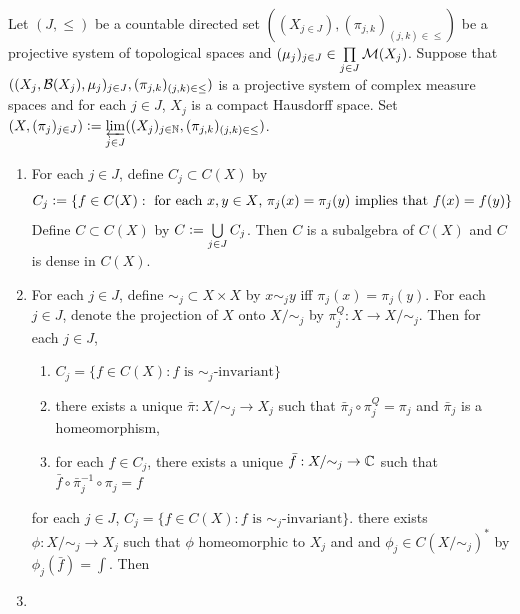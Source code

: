 \documentclass{book}
\begin{document}
	
	\begin{ex} 
		Let $(J, {\leq})$ be a countable directed set $((X_{j \in J}), (\pi_{j,k})_{(j,k) \in \leq})$ be a projective system of topological spaces and $(\mu_j)_{j \in J} \in \prod\limits_{j \in J} \mathcal{M}(X_j)$. Suppose that $((X_j, \mathcal{B}(X_j), \mu_j)_{j \in J}, (\pi_{j,k})_{(j,k) \in {\leq}})$ is a projective system of complex measure spaces and for each $j \in J$, $X_j$ is a compact Hausdorff space. Set $(X, (\pi_j)_{j \in J}) \vcentcolon= \varprojlim\limits_{j \in J} ((X_j)_{j \in \mathbb{N}}, (\pi_{j,k})_{(j,k) \in {\leq}})$. 
		\begin{enumerate}
			\item For each $j \in J$, define $C_j \subset C(X)$ by 
			$$C_j \vcentcolon= \{f \in C(X): \text{ for each $x,y \in X$, $\pi_j(x) = \pi_j(y)$ implies that $f(x) = f(y)$}\}$$
			Define $C \subset C(X)$ by $C \vcentcolon= \bigcup\limits_{j \in J} C_j$. Then $C$ is a subalgebra of $C(X)$ and $C$ is dense in $C(X)$. 
			\item For each $j \in J$, define ${\sim_j}  \subset X \times X$ by $x \sim_j y$ iff $\pi_j(x) = \pi_j(y)$. For each $j \in J$, denote the projection of $X$ onto $X/{\sim_j}$ by $\pi^Q_j: X \rightarrow X/{\sim_j}$. Then for each $j \in J$,
			\begin{enumerate}
				\item $C_j = \{f \in C(X): \text{$f$ is $\sim_j$-invariant}\}$
				\item there exists a unique $\bar{\pi}:X/{\sim_j} \rightarrow X_j$ such that $\bar{\pi}_j \circ \pi^Q_j = \pi_j$ and $\bar{\pi}_j$ is a homeomorphism,
				\item for each $f \in C_j$, there exists a unique $\bar{f}:X/{\sim_j} \rightarrow \mathbb{C}$ such that $\bar{f} \circ \bar{\pi}_j^{-1} \circ \pi_j = f$
			\end{enumerate}
			for each $j \in J$, $C_j = \{f \in C(X): \text{$f$ is $\sim_j$-invariant}\}$. there exists $\phi: X / {\sim_j}  \rightarrow X_j$ such that $\phi$ homeomorphic to $X_j$ and and $\phi_j \in C(X/{\sim_j})^*$ by $\phi_j(\bar{f}) = \int$. Then 
			\item 
		\end{enumerate}
	\end{ex}
	
\end{document}

